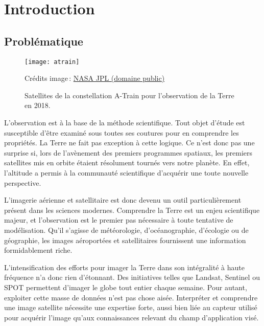 \chapter{Introduction}
\label{chap:intro}
	\minitoc
	\newpage


\section{Problématique}

\begin{figure}[t]
	\texttt{[image: atrain]}
	\caption{Satellites de la constellation A-Train pour l'observation de la Terre en 2018.}
	{\small Crédits image\,: \href{https://commons.wikimedia.org/w/index.php?curid=33645603}{NASA JPL (domaine public)}}
	\label{fig:atrain}
\end{figure}

L'observation est à la base de la méthode scientifique. Tout objet d'étude est susceptible d'être examiné sous toutes ses coutures pour en comprendre les propriétés. La Terre ne fait pas exception à cette logique. Ce n'est donc pas une surprise si, lors de l'avènement des premiers programmes spatiaux, les premiers satellites mis en orbite étaient résolument tournés vers notre planète. En effet, l'altitude a permis à la communauté scientifique d'acquérir une toute nouvelle perspective.

L'imagerie aérienne et satellitaire est donc devenu un outil particulièrement présent dans les sciences modernes. Comprendre la Terre est un enjeu scientifique majeur, et l'observation est le premier pas nécessaire à toute tentative de modélisation. Qu'il s'agisse de météorologie, d'océanographie, d'écologie ou de géographie, les images aéroportées et satellitaires fournissent une information formidablement riche.

L'intensification des efforts pour imager la Terre dans son intégralité à haute fréquence n'a donc rien d'étonnant. Des initiatives telles que \gls{Landsat}, \gls{Sentinel} ou \gls{SPOT} permettent d'imager le globe tout entier chaque semaine. Pour autant, exploiter cette masse de données n'est pas chose aisée. Interpréter et comprendre une image satellite nécessite une expertise forte, aussi bien liée au capteur utilisé pour acquérir l'image qu'aux connaissances relevant du champ d'application visé.

